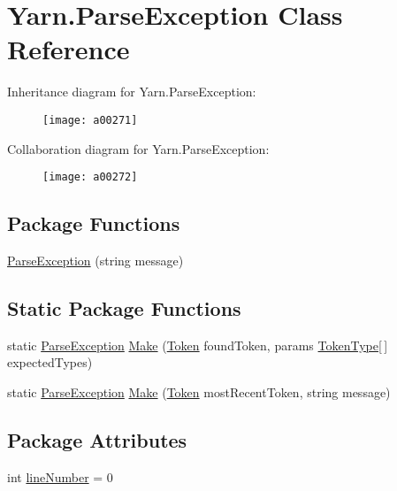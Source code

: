 \hypertarget{a00076}{\section{Yarn.\-Parse\-Exception Class Reference}
\label{a00076}
}


Inheritance diagram for Yarn.\-Parse\-Exception\-:
\nopagebreak
\begin{figure}[H]
\begin{center}
\leavevmode
\texttt{[image: a00271]}
\end{center}
\end{figure}


Collaboration diagram for Yarn.\-Parse\-Exception\-:
\nopagebreak
\begin{figure}[H]
\begin{center}
\leavevmode
\texttt{[image: a00272]}
\end{center}
\end{figure}
\subsection*{Package Functions}
\begin{DoxyCompactItemize}
\item 
\hyperlink{a00076_aa3c4f5c8b0ae86097bbc46044df9f317}{Parse\-Exception} (string message)
\end{DoxyCompactItemize}
\subsection*{Static Package Functions}
\begin{DoxyCompactItemize}
\item 
static \hyperlink{a00076}{Parse\-Exception} \hyperlink{a00076_a511a51bb42dc5bb107eb68f7e5cf5ff1}{Make} (\hyperlink{a00093}{Token} found\-Token, params \hyperlink{a00040_a301aa7c866593a5b625a8fc158bbeace}{Token\-Type}\mbox{[}$\,$\mbox{]} expected\-Types)
\item 
static \hyperlink{a00076}{Parse\-Exception} \hyperlink{a00076_a173f3cabc4741d9d9e016310e90c1c9f}{Make} (\hyperlink{a00093}{Token} most\-Recent\-Token, string message)
\end{DoxyCompactItemize}
\subsection*{Package Attributes}
\begin{DoxyCompactItemize}
\item 
int \hyperlink{a00076_ab335169367e64fd6d89d58b3ac573751}{line\-Number} = 0
\end{DoxyCompactItemize}


